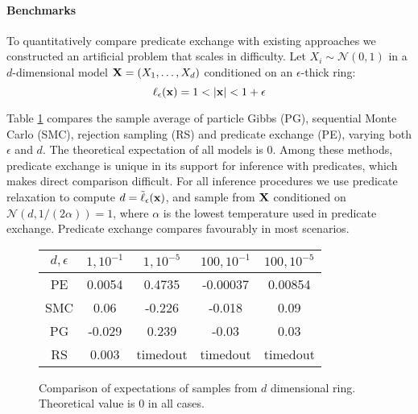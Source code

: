 \paragraph{Benchmarks}
To quantitatively compare predicate exchange with existing approaches we constructed an artificial problem that scales in difficulty.
Let $X_i \sim \mathcal{N}(0,1)$ in a $d$-dimensional model $\mathbf{X} = (X_1, \dots, X_d)$ conditioned on an $\epsilon$-thick ring:
\begin{equation}
\operatorname{\ell}_\epsilon(\mathbf{x}) = 1 < |\mathbf{x}| < 1 + \epsilon
\end{equation}

Table \ref{results} compares the sample average of particle Gibbs (PG), sequential Monte Carlo (SMC), rejection sampling (RS) and predicate exchange (PE), varying both $\epsilon$ and $d$.
The theoretical expectation of all models is 0.
Among these methods, predicate exchange is unique in its support for inference with predicates, which makes direct comparison difficult.
For all inference procedures we use predicate relaxation to compute $d = \tilde{\operatorname{\ell}}_\epsilon(\mathbf{x})$, and sample from $\mathbf{X}$ conditioned on $\mathcal{N}(d, 1/(2\alpha)) = 1$, where $\alpha$ is the lowest temperature used in predicate exchange.
Predicate exchange  compares favourably in most scenarios.


\begin{figure}
\begin{center}
	\begin{tabular}{||c| c c c c||} 
	\hline
	 $d,\epsilon$& $1, {10^{-1}}$ & $1, {10^{-5}}$ & ${100}, {10^{-1}}$ & ${100}, {10^{-5}}$ \\ [0.5ex] 
	\hline\hline
	PE & 0.0054 & 0.4735  & -0.00037 & 0.00854\\ 
	\hline
	SMC & 0.06 & -0.226  & -0.018 & 0.09\\ 
	\hline
	PG & -0.029 & 0.239 & -0.03 & 0.03\\
	\hline
	RS & 0.003 & timedout & timedout & timedout \\
	\hline
 \end{tabular}
 \label{results}
 \caption{Comparison of expectations of samples from $d$ dimensional ring.  Theoretical value is 0 in all cases.}
\end{center}
\vspace{-2em}
\end{figure}

  